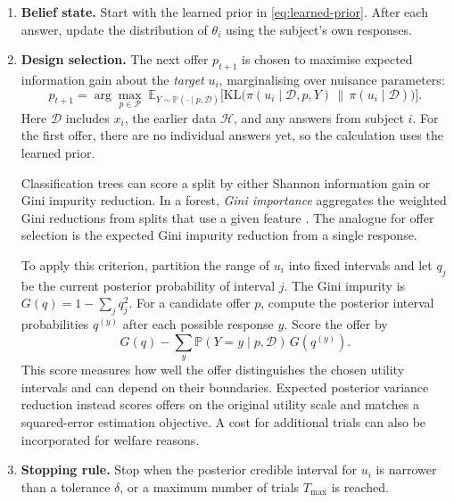 \documentclass[11pt,a4paper]{article}
\newcommand{\E}{\mathbb{E}}
\newcommand{\Prob}{\mathbb{P}}
\newcommand{\KL}{\mathrm{KL}}
\begin{document}
\begin{enumerate}[leftmargin=*]
  \item \textbf{Belief state.} Start with the learned prior in \cref{eq:learned-prior}. After each answer, update the distribution of $\theta_i$ using the subject's own responses.
  \item \textbf{Design selection.} The next offer $p_{t+1}$ is chosen to maximise expected information gain about the \emph{target} $u_i$, marginalising over nuisance parameters:
  \begin{equation}
    p_{t+1} = \arg\max_{p\in\mathcal{P}}\;
    \E_{Y\sim \Prob(\cdot\mid p,\mathcal{D})}
    \Big[\KL\big(\pi(u_i\mid \mathcal{D},p,Y)\,\big\|\,\pi(u_i\mid\mathcal{D})\big)\Big].
    \label{eq:eig}
  \end{equation}
  Here $\mathcal D$ includes $x_i$, the earlier data $\mathcal H$, and any answers from subject $i$. For the first offer, there are no individual answers yet, so the calculation uses the learned prior.

  Classification trees can score a split by either Shannon information gain or Gini impurity reduction. In a forest, \emph{Gini importance} aggregates the weighted Gini reductions from splits that use a given feature \citep{louppe2013}. The analogue for offer selection is the expected Gini impurity reduction from a single response.

  To apply this criterion, partition the range of $u_i$ into fixed intervals and let $q_j$ be the current posterior probability of interval $j$. The Gini impurity is $G(q)=1-\sum_j q_j^2$. For a candidate offer $p$, compute the posterior interval probabilities $q^{(y)}$ after each possible response $y$. Score the offer by
  \[
    G(q)-\sum_y \Prob(Y=y\mid p,\mathcal{D})\,G(q^{(y)}).
  \]
  This score measures how well the offer distinguishes the chosen utility intervals and can depend on their boundaries. Expected posterior variance reduction instead scores offers on the original utility scale and matches a squared-error estimation objective. A cost for additional trials can also be incorporated for welfare reasons.
  \item \textbf{Stopping rule.} Stop when the posterior credible interval for $u_i$ is narrower than a tolerance $\delta$, or a maximum number of trials $T_{\max}$ is reached.
\end{enumerate}
\end{document}
